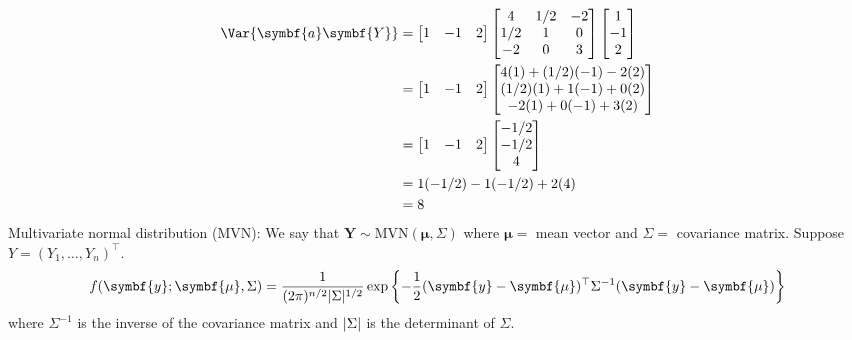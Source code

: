 \begin{align*}
    \Var{\symbf{a}\symbf{Y}}
     & =
    \begin{bmatrix}
        1 & -1 & 2
    \end{bmatrix}
    \begin{bmatrix}
        4   & 1/2 & -2 \\
        1/2 & 1   & 0  \\
        -2  & 0   & 3
    \end{bmatrix}
    \begin{bmatrix}
        1  \\
        -1 \\
        2
    \end{bmatrix}     \\
     & =
    \begin{bmatrix}
        1 & -1 & 2
    \end{bmatrix}
    \begin{bmatrix}
        4(1)+(1/2)(-1)-2(2) \\
        (1/2)(1)+1(-1)+0(2) \\
        -2(1)+0(-1)+3(2)
    \end{bmatrix}     \\
     & =\begin{bmatrix}
        1 & -1 & 2
    \end{bmatrix}
    \begin{bmatrix}
        -1/2 \\
        -1/2 \\
        4
    \end{bmatrix}     \\
     & =1(-1/2)-1(-1/2)+2(4)       \\
     & =8
\end{align*}
Multivariate normal distribution (MVN):
We say that $ \symbf{Y} \sim \text{MVN}(\symbf{\mu},\Sigma) $
where $ \symbf{\mu}= $ mean vector and $ \Sigma= $
covariance matrix. Suppose $ Y=(Y_1,\ldots,Y_n)^\top $.
\[ f(\symbf{y};\symbf{\mu},\Sigma)=
    \frac{1}{(2\pi)^{n/2}\abs{\Sigma}^{1/2}}
    \exp\left\{ -\frac{1}{2}(\symbf{y}-\symbf{\mu})^\top
    \Sigma^{-1}(\symbf{y}-\symbf{\mu}) \right\}  \]
where $ \Sigma^{-1} $ is the inverse of the covariance matrix
and $ \lvert\Sigma\rvert $ is the determinant of $ \Sigma $.

